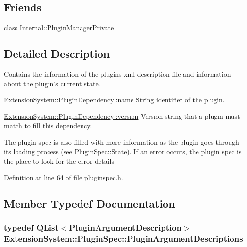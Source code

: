\subsection*{\-Friends}
\begin{DoxyCompactItemize}
\item 
class \hyperlink{class_extension_system_1_1_plugin_spec_ac886620628a69def5b6d57fa12c39179}{\-Internal\-::\-Plugin\-Manager\-Private}
\end{DoxyCompactItemize}


\subsection{\-Detailed \-Description}
\-Contains the information of the plugins xml description file and information about the plugin's current state. 

\hyperlink{struct_extension_system_1_1_plugin_dependency_acd2cf6b00e6408b5fe155340a8159183}{\-Extension\-System\-::\-Plugin\-Dependency\-::name} \-String identifier of the plugin.

\hyperlink{struct_extension_system_1_1_plugin_dependency_a2d00bf5564134af5cb2eeddf2074eee8}{\-Extension\-System\-::\-Plugin\-Dependency\-::version} \-Version string that a plugin must match to fill this dependency.

\-The plugin spec is also filled with more information as the plugin goes through its loading process (see \hyperlink{class_extension_system_1_1_plugin_spec_a3d40e1bd1f17eb32b314bcd282b3e3b9}{\-Plugin\-Spec\-::\-State}). \-If an error occurs, the plugin spec is the place to look for the error details. 

\-Definition at line 64 of file pluginspec.\-h.



\subsection{\-Member \-Typedef \-Documentation}
\hypertarget{class_extension_system_1_1_plugin_spec_acf81cc5fcc20b047203f9da886cbbdee}{
\subsubsection[{\-Plugin\-Argument\-Descriptions}]{\setlength{\rightskip}{0pt plus 5cm}typedef \-Q\-List$<${\bf \-Plugin\-Argument\-Description}$>$ {\bf \-Extension\-System\-::\-Plugin\-Spec\-::\-Plugin\-Argument\-Descriptions}}}\label{class_extension_system_1_1_plugin_spec_acf81cc5fcc20b047203f9da886cbbdee}


